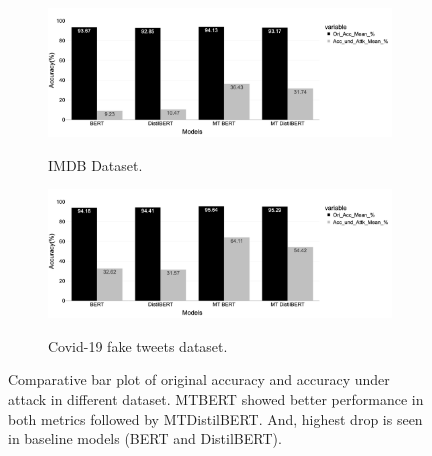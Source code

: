 \documentclass[%
	BCOR=8mm, %
	DIV=12,
	toc=bibliography, %
	toc=listof, %
	oneside, %
	egregdoesnotlikesansseriftitles, %
	]{scrbook}
\begin{document}

\begin{figure}[H]
    \centering
    \begin{subfigure}
            \centering
            \includegraphics[width=.85\linewidth]{img/MOAandAUA_Imdb.png}
            \caption{IMDB Dataset.}{}
               \label{fig:}
        \end{subfigure}
    \begin{subfigure}
            \centering
            \includegraphics[width=.85\linewidth]{img/MOAandAUA_fknews}
            \caption{Covid-19 fake tweets dataset.}{}
              \label{fig:sub2}
        \end{subfigure}
 \caption[Comparative bar plot of original accuracy and accuracy under attack]{\small Comparative bar plot of original accuracy and accuracy under attack in different dataset. MTBERT showed better performance in both metrics followed by MTDistilBERT. And, highest drop is seen in baseline models (BERT and DistilBERT).}
  \label{fig:moaandauaimdb}
\end{figure}
\end{document}
